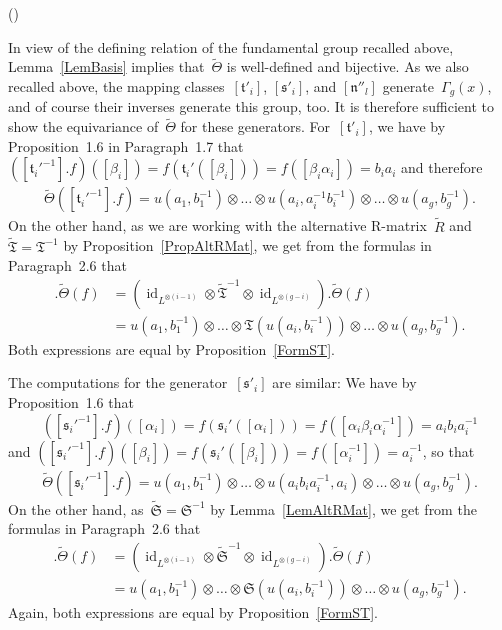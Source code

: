 \documentclass[12pt]{article}
\makeatletter
\newcounter{num}
\newenvironment{pflist}{\begin{list}{(\arabic{num})}{\usecounter{num} \leftmargin0cm \itemindent5pt}}{\end{list}}
\theoremstyle{definition}
\theoremstyle{break}
\renewenvironment{proof}[1][\proofname]{\par
\vspace{-5pt}%
\pushQED{\qed}%
\normalfont
\topsep0pt \partopsep0pt %
\trivlist
\item[\hskip\labelsep
\bfseries
#1\@addpunct{.}]\ignorespaces
}{%
\popQED\endtrivlist\@endpefalse
\addvspace{6pt plus 6pt} %
}
\DeclareMathOperator\id{id}
\newcommand{\fS}{\mathfrak{S}}
\newcommand{\fT}{\mathfrak{T}}
\newcommand{\fs}{\mathfrak{s}}
\newcommand{\ft}{\mathfrak{t}}
\newcommand{\fn}{\mathfrak{n}}
\renewcommand{\1}{\mathbbm{1}}
\newcommand{\ot}{\mathbin{\otimes}}
\newcommand{\uu}{u}
\makeatother
\begin{document}
\begin{proof}
\begin{pflist}
\item
In view of the defining relation of the fundamental group recalled above, Lemma~\ref{LemBasis} implies that~$\tilde{\Theta}$ is well-defined and bijective. As we also recalled above, the mapping classes~$[\ft'_i]$, $[\fs'_i]$, and $[\fn''_l]$ generate~$\Gamma_{g}(x)$, and of course their inverses generate this group, too. It is therefore sufficient to show the equivariance of~$\tilde{\Theta}$ for these generators. For~$[\ft'_i]$, we have by Proposition~1.6 in Paragraph~1.7 that
$([\ft_i'^{-1}].f)([\beta_i]) = f(\ft_i'([\beta_i])) = f([\beta_i \alpha_i]) = b_i a_i$ and therefore
\begin{align*}
\tilde{\Theta}([\ft_i'^{-1}].f) = \uu(a_1,b_1^{-1}) \ot \dots
\ot \uu(a_i,a_i^{-1} b_i^{-1}) \ot \dots \ot \uu(a_g,b_g^{-1}).
\end{align*}
On the other hand, as we are working with the alternative R-matrix~$\tilde{R}$ and~$\tilde{\fT} = \fT^{-1}$ by Proposition~\ref{PropAltRMat}, we get from the formulas in Paragraph~2.6 that
\begin{align*}
[\ft_i'^{-1}].\tilde{\Theta}(f) &=
(\id_{L^{\ot (i-1)}} \ot \tilde{\fT}^{-1} \ot \id_{L^{\ot (g-i)}}).\tilde{\Theta}(f) \\
&=
\uu(a_1,b_1^{-1}) \ot \dots \ot \fT(\uu(a_i,b_i^{-1})) \ot \dots \ot \uu(a_g,b_g^{-1}).
\end{align*}
Both expressions are equal by Proposition~\ref{FormST}.

\item
The computations for the generator~$[\fs'_i]$ are similar: We have by Proposition~1.6 that
\[([\fs_i'^{-1}].f)([\alpha_i]) = f(\fs_i'([\alpha_i])) = f([\alpha_i \beta_i \alpha_i^{-1}]) = a_i b_i a_i^{-1}\]
and
$([\fs_i'^{-1}].f)([\beta_i]) = f(\fs_i'([\beta_i])) = f([\alpha_i^{-1}]) = a_i^{-1}$, so that
\begin{align*}
\tilde{\Theta}([\fs_i'^{-1}].f) = \uu(a_1,b_1^{-1}) \ot \dots \ot
\uu(a_i b_i a_i^{-1},a_i) \ot \dots \ot \uu(a_g,b_g^{-1}).
\end{align*}
On the other hand, as~$\tilde{\fS} = \fS^{-1}$ by Lemma~\ref{LemAltRMat}, we get from the formulas in Paragraph~2.6 that
\begin{align*}
[\fs_i'^{-1}].\tilde{\Theta}(f) &=
(\id_{L^{\ot (i-1)}} \ot \tilde{\fS}^{-1} \ot \id_{L^{\ot (g-i)}}).\tilde{\Theta}(f) \\
&=
\uu(a_1,b_1^{-1}) \ot \dots \ot \fS(\uu(a_i,b_i^{-1})) \ot \dots \ot \uu(a_g,b_g^{-1}).
\end{align*}
Again, both expressions are equal by Proposition~\ref{FormST}.


\end{pflist}
\end{proof}
\end{document}
